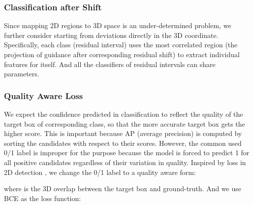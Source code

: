 \documentclass[10pt,twocolumn,letterpaper]{article}
\begin{document}
\subsubsection{Classification after Shift}
\label{shift}
Since mapping 2D regions to 3D space is an under-determined problem, we further consider starting from deviations directly in the 3D coordinate. Specifically, each class (residual interval) uses the most correlated region (the projection of guidance after corresponding residual shift) to extract individual features for itself. And all the classifiers of residual intervals can share parameters.

\subsubsection{Quality Aware Loss}
\label{sec:loss}
We expect the confidence predicted in classification to reflect the quality of the target box of corresponding class, so that the more accurate target box gets the higher score. This is important because AP (average precision) is computed by sorting the candidates with respect to their scores. 
However, the common used 0/1 label is improper for the purpose because the model is forced to predict 1 for all positive candidates regardless of their variation in quality. Inspired by loss in 2D detection \cite{iounet}, we change the 0/1 label to a quality aware form:

where  is the 3D overlap between the target box and ground-truth.
And we use BCE as the loss function:
\end{document}
